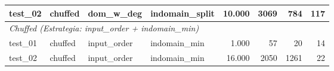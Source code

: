 \begin{longtable}{l l l l r r r r}
    test\_02         & chuffed         & dom\_w\_deg       & indomain\_split   & 10.000             & 3069           & 784               & 117            \\
    \midrule
    \multicolumn{8}{l}{\textit{Chuffed (Estrategia: input\_order + indomain\_min)}}                                                                       \\
    \midrule
    test\_01         & chuffed         & input\_order      & indomain\_min     & 1.000              & 57             & 20                & 14             \\
    test\_02         & chuffed         & input\_order      & indomain\_min     & 16.000             & 2050           & 1261              & 22             \\
\end{longtable}

